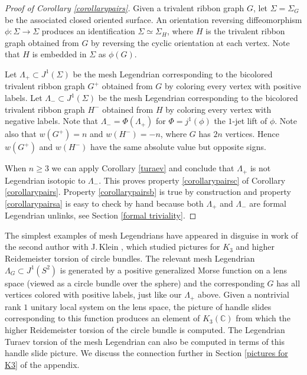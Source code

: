\documentclass[11pt]{article}
\numberwithin{equation}{section}\providecommand{\dpl}{\displaystyle}
\theoremstyle{plain}
\theoremstyle{definition}
\newcommand{\bC}{\mathbb{C}}\newcommand{\bD}{\mathbb{D}}
\begin{document}
\begin{proof}[Proof of Corollary \ref{corollarypairs}] Given a trivalent ribbon graph $G$, let $\Sigma=\Sigma_G$ be the associated closed oriented surface. An orientation reversing diffeomorphism $\phi: \Sigma \to \Sigma$ produces an identification $\Sigma \simeq \Sigma_{H}$, where $H$ is the trivalent ribbon graph obtained from $G$ by reversing the cyclic orientation at each vertex. Note that $H$ is embedded in $\Sigma$ as $\phi(G)$.

Let $\Lambda_+ \subset J^1(\Sigma)$ be the mesh Legendrian corresponding to the bicolored trivalent ribbon graph $G^+$ obtained from $G$ by coloring every vertex with positive labels. Let $\Lambda_- \subset J^1(\Sigma)$ be the mesh Legendrian corresponding to the bicolored trivalent ribbon graph $H^-$ obtained from $H$ by coloring every vertex with negative labels. Note that $\Lambda_-=\Phi(\Lambda_+)$ for $\Phi=j^1(\phi)$ the $1$-jet lift of $\phi$. Note also that $w(G^+)=n$ and $w(H^-)=-n$, where $G$ has $2n$ vertices. Hence $w(G^+)$ and $w( H^-)$ have the same absolute value but opposite signs.

When $n\geq 3$ we can apply Corollary \ref{turaev} and conclude that $\Lambda_+$ is not Legendrian isotopic to $\Lambda_-$. This proves property \eqref{corollarypairsc} of Corollary \ref{corollarypairs}. Property \eqref{corollarypairsb} is true by construction and property \eqref{corollarypairsa} is easy to check by hand because both $\Lambda_+$ and $\Lambda_-$ are formal Legendrian unlinks, see Section \ref{formal triviality}. \end{proof}
The simplest examples of mesh Legendrians have appeared in disguise in work of the second author with J.\,Klein \cite{IK93}, which studied pictures for $K_3$ and higher Reidemeister torsion of circle bundles. The relevant mesh Legendrian $\Lambda_G \subset J^1(S^2)$ is generated by a positive generalized Morse function on a lens space (viewed as a circle bundle over the sphere) and the corresponding $G$ has all vertices colored with positive labels, just like our $\Lambda_+$ above. Given a nontrivial rank $1$ unitary local system on the lens space, the picture of handle slides corresponding to this function produces an element of $K_3(\bC)$ from which the higher Reidemeister torsion of the circle bundle is computed. The Legendrian Turaev torsion of the mesh Legendrian can also be computed in terms of this handle slide picture. We discuss the connection further in Section \ref{pictures for K3} of the appendix.
\end{document}
